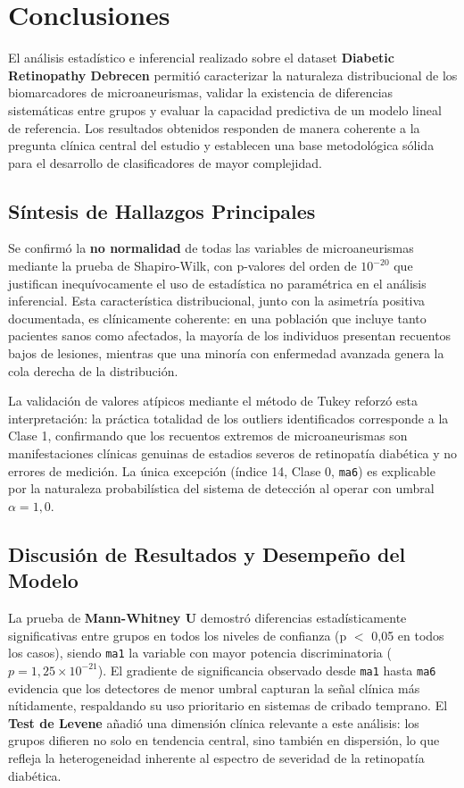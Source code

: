 \section{Conclusiones}

El análisis estadístico e inferencial realizado sobre el dataset \textbf{Diabetic
Retinopathy Debrecen} permitió caracterizar la naturaleza distribucional de los
biomarcadores de microaneurismas, validar la existencia de diferencias sistemáticas
entre grupos y evaluar la capacidad predictiva de un modelo lineal de referencia.
Los resultados obtenidos responden de manera coherente a la pregunta clínica central
del estudio y establecen una base metodológica sólida para el desarrollo de
clasificadores de mayor complejidad.

\subsection{Síntesis de Hallazgos Principales}

Se confirmó la \textbf{no normalidad} de todas las variables de microaneurismas mediante
la prueba de Shapiro-Wilk, con p-valores del orden de $10^{-20}$ que justifican
inequívocamente el uso de estadística no paramétrica en el análisis inferencial. Esta
característica distribucional, junto con la asimetría positiva documentada, es
clínicamente coherente: en una población que incluye tanto pacientes sanos como
afectados, la mayoría de los individuos presentan recuentos bajos de lesiones, mientras
que una minoría con enfermedad avanzada genera la cola derecha de la distribución.

La validación de valores atípicos mediante el método de Tukey reforzó esta interpretación:
la práctica totalidad de los outliers identificados corresponde a la Clase 1, confirmando
que los recuentos extremos de microaneurismas son manifestaciones clínicas genuinas de
estadios severos de retinopatía diabética y no errores de medición. La única excepción
(índice 14, Clase 0, \texttt{ma6}) es explicable por la naturaleza probabilística del
sistema de detección al operar con umbral $\alpha = 1{,}0$.

\subsection{Discusión de Resultados y Desempeño del Modelo}

La prueba de \textbf{Mann-Whitney U} demostró diferencias estadísticamente significativas
entre grupos en todos los niveles de confianza (p $<$ 0,05 en todos los casos), siendo
\texttt{ma1} la variable con mayor potencia discriminatoria ($p = 1{,}25 \times 10^{-21}$).
El gradiente de significancia observado desde \texttt{ma1} hasta \texttt{ma6} evidencia
que los detectores de menor umbral capturan la señal clínica más nítidamente, respaldando
su uso prioritario en sistemas de cribado temprano. El \textbf{Test de Levene} añadió
una dimensión clínica relevante a este análisis: los grupos difieren no solo en tendencia
central, sino también en dispersión, lo que refleja la heterogeneidad inherente al
espectro de severidad de la retinopatía diabética.

